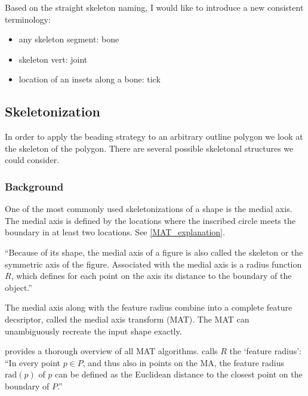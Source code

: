 Based on the straight skeleton naming, I would like to introduce a new consistent terminology:
\begin{itemize}
\item any skeleton segment: bone
\item skeleton vert: joint
\item location of an insets along a bone: tick
\end{itemize}






















\subsection{Skeletonization}
In order to apply the beading strategy to an arbitrary outline polygon we look at the skeleton of the polygon.
There are several possible skeletonal structures we could consider.


\subsubsection{Background}
One of the most commonly used skeletonizations of a shape is the medial axis.
The medial axis is defined by the locations where the inscribed circle meets the boundary in at least two locations. 
See \cref{MAT_explanation}.

``Because of its shape, the medial axis of a figure is also called the skeleton or the symmetric axis of the figure.
Associated with the medial axis is a radius function $R$, which defines for each point on the axis its distance to the boundary of the object.''
\cite{lee1982medial}

The medial axis along with the feature radius combine into a complete feature decsriptor, called the medial axis transform (MAT).
The MAT can unambiguously recreate the input shape exactly. 

\cite{Moesen2011} provides a thorough overview of all MAT algorithms.
\cite{Moesen2011} calls $R$ the `feature radius': ``In every point $p \in P$, and thus also in points on the MA, the feature radius $\text{rad}(p)$ of $p$ can be defined as the Euclidean distance to the closest point on the boundary of $P$.''


